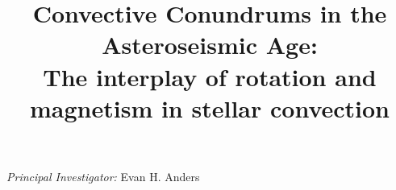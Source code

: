 \documentclass[11pt, preprint]{aastex}
\begin{document}
\title{Convective Conundrums in the Asteroseismic Age:\\The interplay of rotation and magnetism in stellar convection}
\maketitle
\begin{flushleft}
  \textit{Principal Investigator:} Evan H. Anders 
\end{flushleft}

\vspace{-1cm}


%
%

\vspace{-0.6cm}
\end{document}
